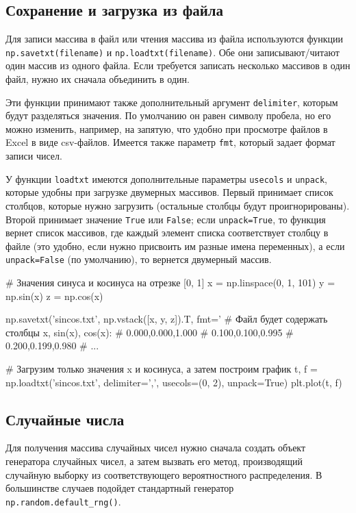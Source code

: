 \subsection{Сохранение и загрузка из файла}
Для записи массива в файл или чтения массива из файла используются функции \verb"np.savetxt(filename)" и \verb"np.loadtxt(filename)".
Обе они записывают/читают один массив из одного файла.
Если требуется записать несколько массивов в один файл, нужно их сначала объединить в один. 

Эти функции принимают также дополнительный аргумент \verb"delimiter", которым будут разделяться значения. 
По умолчанию он равен символу пробела, но его можно изменить, например, на запятую, что удобно при просмотре файлов в Excel в виде csv-файлов.
Имеется также параметр \verb"fmt", который задает формат записи чисел.

У функции \verb"loadtxt" имеются дополнительные параметры \verb"usecols" и \verb"unpack", которые удобны при загрузке двумерных массивов.
Первый принимает список столбцов, которые нужно загрузить (остальные столбцы будут проигнорированы). 
Второй принимает значение \verb"True" или \verb"False"; если \verb"unpack=True", то функция вернет список массивов, где каждый элемент списка соответствует столбцу в файле (это удобно, если нужно присвоить им разные имена переменных), а если \verb"unpack=False" (по умолчанию), то вернется двумерный массив.
\begin{python}
# Значения синуса и косинуса на отрезке [0, 1]
x = np.linspace(0, 1, 101)
y = np.sin(x)
z = np.cos(x)

np.savetxt('sincos.txt', np.vstack([x, y, z]).T, fmt='%
# Файл будет содержать столбцы x, sin(x), cos(x):
# 0.000,0.000,1.000
# 0.100,0.100,0.995
# 0.200,0.199,0.980
# ...

# Загрузим только значения x и косинуса, а затем построим график
t, f = np.loadtxt('sincos.txt', delimiter=',', usecols=(0, 2), unpack=True)
plt.plot(t, f)
\end{python}


\subsection{Случайные числа}
Для получения массива случайных чисел нужно сначала создать объект генератора случайных чисел, а затем вызвать его метод, производящий случайную выборку из соответствующего вероятностного распределения. 
В большинстве случаев подойдет стандартный генератор \verb"np.random.default_rng()".

